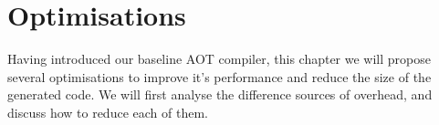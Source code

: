 \chapter{Optimisations}
\label{sec-optimisations}
Having introduced our baseline AOT compiler, this chapter we will propose several optimisations to improve it's performance and reduce the size of the generated code. We will first analyse the difference sources of overhead, and discuss how to reduce each of them.

